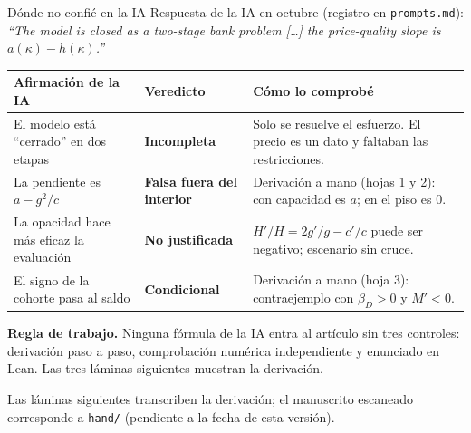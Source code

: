 \documentclass[aspectratio=169,10pt,t]{beamer}
\newcommand{\source}[1]{\par\vfill{\fontsize{6}{7.2}\selectfont\color{soft}#1\par}}
\begin{document}
\begin{frame}{Dónde no confié en la IA}
\vspace{1.5mm}
\small
Respuesta de la IA en octubre (registro en \texttt{prompts.md}):
\emph{``The model is closed as a two-stage bank problem [\dots] the price-quality
slope is $a(\kappa)-h(\kappa)$.''}
\vspace{1mm}

\renewcommand{\arraystretch}{1.0}
\begin{tabular}{@{}>{\raggedright\arraybackslash}p{.30\linewidth}
  >{\raggedright\arraybackslash}p{.20\linewidth}
  >{\raggedright\arraybackslash}p{.42\linewidth}@{}}
\toprule \textbf{Afirmación de la IA} & \textbf{Veredicto} & \textbf{Cómo lo comprobé}\\\midrule
El modelo está ``cerrado'' en dos etapas & \textcolor{accent}{\textbf{Incompleta}} &
Solo se resuelve el esfuerzo. El precio es un dato y faltaban las restricciones.\\
La pendiente es $a-g^{2}/c$ & \textcolor{accent}{\textbf{Falsa fuera del interior}} &
Derivación a mano (hojas 1 y 2): con capacidad es $a$; en el piso es $0$.\\
La opacidad hace más eficaz la evaluación & \textcolor{accent}{\textbf{No justificada}} &
$H'/H=2g'/g-c'/c$ puede ser negativo; escenario sin cruce.\\
El signo de la cohorte pasa al saldo & \textcolor{accent}{\textbf{Condicional}} &
Derivación a mano (hoja 3): contraejemplo con $\beta_{D}>0$ y $M'<0$.\\\bottomrule
\end{tabular}
\vspace{1.5mm}
\begin{keybox}\small
\textbf{Regla de trabajo.} Ninguna fórmula de la IA entra al artículo sin tres
controles: derivación paso a paso, comprobación numérica independiente y enunciado
en Lean. Las tres láminas siguientes muestran la derivación.
\end{keybox}
\source{Las láminas siguientes transcriben la derivación; el manuscrito escaneado
corresponde a \texttt{hand/} (pendiente a la fecha de esta versión).}
\end{frame}
\end{document}
